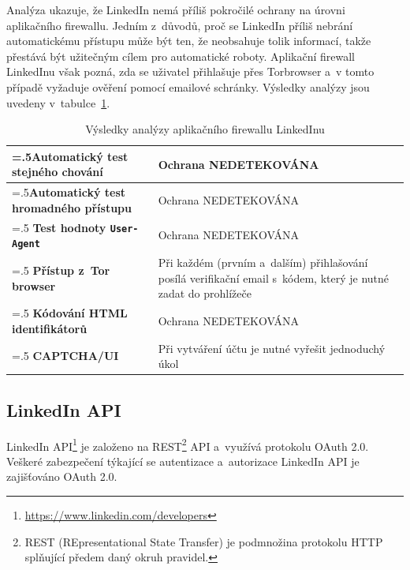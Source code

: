 Analýza ukazuje, že LinkedIn nemá příliš pokročilé ochrany na úrovni aplikačního firewallu. Jedním z~důvodů, proč se LinkedIn příliš nebrání automatickému přístupu může být ten, že neobsahuje tolik  informací, takže přestává být užitečným cílem pro automatické roboty. Aplikační firewall LinkedInu však pozná, zda se uživatel přihlašuje přes Torbrowser a~v tomto případě vyžaduje ověření pomocí emailové schránky. Výsledky analýzy jsou uvedeny v~tabulce~\ref{tab:LinkedIn_analyse}.

\begin{table}[H]
\begin{tabularx}{\linewidth}{
  |>{\raggedright\arraybackslash\hsize=.5\hsize}X|>{\hsize=1.5\hsize}X|
  }
\hline

\textbf{Automatický test stejného chování} & Ochrana NEDETEKOVÁNA \\
\hline
\textbf{Automatický test hromadného přístupu} & Ochrana NEDETEKOVÁNA \\
\hline
\textbf{Test hodnoty \texttt{User-Agent}} & Ochrana NEDETEKOVÁNA \\
\hline
\textbf{Přístup z~Tor browser} & Při každém (prvním a~dalším) přihlašování posílá verifikační email s~kódem, který je nutné zadat do prohlížeče \\
\hline
\textbf{Kódování HTML identifikátorů} & Ochrana NEDETEKOVÁNA \\
\hline
\textbf{CAPTCHA/UI} & Při vytváření účtu je nutné vyřešit jednoduchý úkol \\
\hline
\end{tabularx}

\label{tab:LinkedIn_analyse}
\caption{Výsledky analýzy aplikačního firewallu LinkedInu}
\end{table}

\subsection*{LinkedIn API}
LinkedIn API\footnote{\href{https://www.linkedin.com/developers}{https://www.linkedin.com/developers}} je založeno na REST\footnote{REST (REpresentational State Transfer) je podmnožina protokolu HTTP splňující předem daný okruh pravidel.} API a~využívá protokolu OAuth 2.0. Veškeré zabezpečení týkající se autentizace a~autorizace LinkedIn API je zajišťováno OAuth 2.0.

